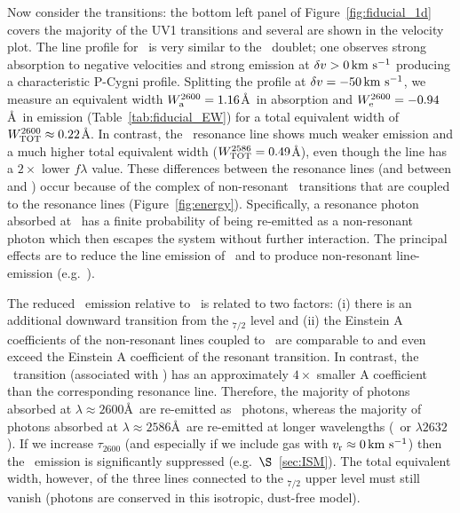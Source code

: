 \documentclass[12pt,preprint]{aastex}
\begin{document}
Now consider the  transitions:
the bottom left panel of Figure~\ref{fig:fiducial_1d} covers the
majority of the  UV1 transitions and several are
shown in the velocity plot.  The line
profile for \feiib\ is very similar to the \mgiid\ doublet;
one observes strong absorption to negative velocities and strong
emission at $\delta v > 0 \, {\rm km~s^{-1}}$ producing a characteristic P-Cygni profile. 
Splitting
the profile at $\delta v = -50 \, {\rm km~s^{-1}}$, we measure an equivalent width
$W^{2600}_{\rm a} = 1.16$\AA\ in absorption and $W^{2600}_{\rm e} =
-0.94$\AA\ in emission (Table~\ref{tab:fiducial_EW}) for a total
equivalent width of $W^{2600}_{\rm TOT} \approx 0.22$\AA.  
In contrast, the \feiia\ resonance line shows much weaker emission and
a much higher total equivalent width ($W^{2586}_{\rm TOT} = 0.49$\AA),
even though the line has a $2 \times$ lower $f\lambda$ value.
These differences between the  resonance lines (and between
 and ) occur because of the complex of non-resonant
\feiis\ transitions that are coupled to the resonance lines
(Figure~\ref{fig:energy}).  Specifically, 
a resonance photon absorbed at \feiid\ has a finite probability of
being re-emitted as a non-resonant photon which then escapes the system
without further interaction.  The principal effects are to reduce the
line emission of \feiid\ and to produce non-resonant line-emission (e.g.\
\feiic).

The reduced \feiia\ emission relative to \feiib\ is related to
two factors:
(i) there is an additional downward transition from the
\zconfig$_{7/2}$ level and 
(ii) the Einstein A
coefficients of the non-resonant lines coupled to \feiia\ are comparable to and even
exceed the Einstein A coefficient of
the resonant transition.  In contrast, 
the \feiie\ transition (associated with \feiib)
has an approximately  $4\times$ smaller A coefficient than the
corresponding
resonance line.  Therefore, the majority of photons absorbed at
$\lambda \approx 2600$\AA\ are re-emitted as \feiib\ photons, whereas 
the majority of photons absorbed at $\lambda \approx 2586$\AA\ are re-emitted 
at longer wavelengths (\feiic\ or $\lambda 2632$).
If we %
increase $\tau_{2600}$ (and especially if we include
gas with $v_{\rm r} \approx 0 \, {\rm km~s^{-1}}$) then the \feiib\ emission is
significantly suppressed (e.g.\ $\S$~\ref{sec:ISM}).
The total equivalent width, however, of the three lines connected to the
\zconfig$_{7/2}$ upper level must still vanish (photons are conserved
in this isotropic, dust-free model).
\end{document}
